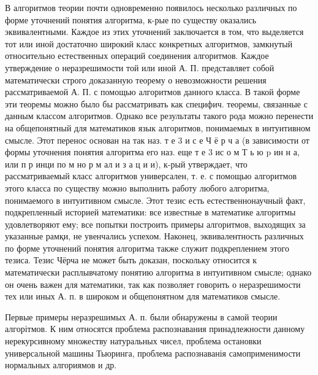 \documentclass[10pt]{article}
\begin{document}
В алгоритмов теории почти одновременно появилось несколько различных по форме уточнений понятия алгоритма, к-рые по существу оказались эквивалентными. Каждое из этих уточнений заключается в том, что выделяется тот или иной достаточно широкий класс конкретных алгоритмов, замкнутый относительно естественных операций соединения алгоритмов. Каждое утверждение о неразрешимости той или иной А. П. представляет собой математически строго доказанную теорему о невозможности решения рассматриваемой А. П. с помощью алгоритмов данного класса. В такой форме эти теоремы можно было бы рассматривать как специфич. теоремы, связанные с данным классом алгоритмов. Однако все результаты такого рода можно перенести на общепонятный для математиков язык алгоритмов, понимаемых в интуитивном смысле. Этот перенос основан на так наз. т е 3 и с е Ч ё р ч а (в зависимости от формы уточнения понятия алгоритма его наз. еще т е 3 ис о м Т ь ю $\mathrm{p}$ ин н а, или п р инци по м но р м ал и з а ц и и), к-рый утверждает, что рассматриваемый класс алгоритмов универсален, т. е. с помощью алгоритмов этого класса по существу можно выполнить работу любого алгоритма, понимаемого в интуитивном смысле. Этот тезис есть естественнонаучный факт, подкрепленный историей математики: все известные в математике алгоритмы удовлетворяют ему; все попытки построить примеры алгоритмов, выходящих за указанные рамқи, не увенчались успехом. Наконец, эквивалентность различных по форме уточнений понятия алгоритма также служит подкреплением этого тезиса. Тезис Чёрча не может быть доказан, поскольку относится к математически расплывчатому понятию алгоритма в интуитивном смысле; однако он очень важен для математики, так как позволяет говорить о неразрешимости тех или иных А. п. в широком и общепонятном для математиков смысле.



Первые примеры неразрешимых А. п. были обнаружены в самой теории алгорітмов. К ним относятся проблема распознавания принадлежности данному нерекурсивному множеству натуральных чисел, проблема остановки универсальной машины Тьюринга, проблема распознаванія самоприменимости нормальных алгориямов и др.
\end{document}
